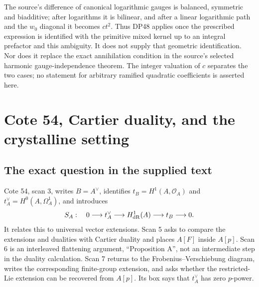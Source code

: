 \documentclass[11pt,a4paper]{article}
\theoremstyle{definition}\newtheorem{remark}[theorem]{Remark}
\begin{document}
The source's difference of canonical logarithmic gauges is balanced, symmetric and biadditive; after logarithms it is bilinear, and after a linear logarithmic path and the $w_0$ diagonal it becomes $ct^2$. Thus DP48 applies once the prescribed expression is identified with the primitive mixed kernel up to an integral prefactor and this ambiguity. It does not supply that geometric identification. Nor does it replace the exact annihilation condition in the source's selected harmonic gauge-independence theorem. The integer valuation of $c$ separates the two cases; no statement for arbitrary ramified quadratic coefficients is asserted here.


\section{Cote 54, Cartier duality, and the crystalline setting}

\subsection{The exact question in the supplied text}

Cote 54, scan 3, writes $B=A^\vee$, identifies $t_B=H^1(A,\mathcal O_A)$ and $t_A^\vee=H^0(A,\Omega_A^1)$, and introduces
\begin{equation}\label{eq:SA}
 S_A:\quad 0\longrightarrow t_A^\vee\longrightarrow H^1_{\mathrm{dR}}(A)
 \longrightarrow t_B\longrightarrow0.
\end{equation}
It relates this to universal vector extensions. Scan 5 asks to compare the extensions and dualities with Cartier duality and places $A[F]$ inside $A[p]$. Scan 6 is an interleaved flattening argument, ``Proposition A'', not an intermediate step in the duality calculation. Scan 7 returns to the Frobenius--Verschiebung diagram, writes the corresponding finite-group extension, and asks whether the restricted-Lie extension can be recovered from $A[p]$. Its box says that $t_A^\vee$ has zero $p$-power.
\end{document}
